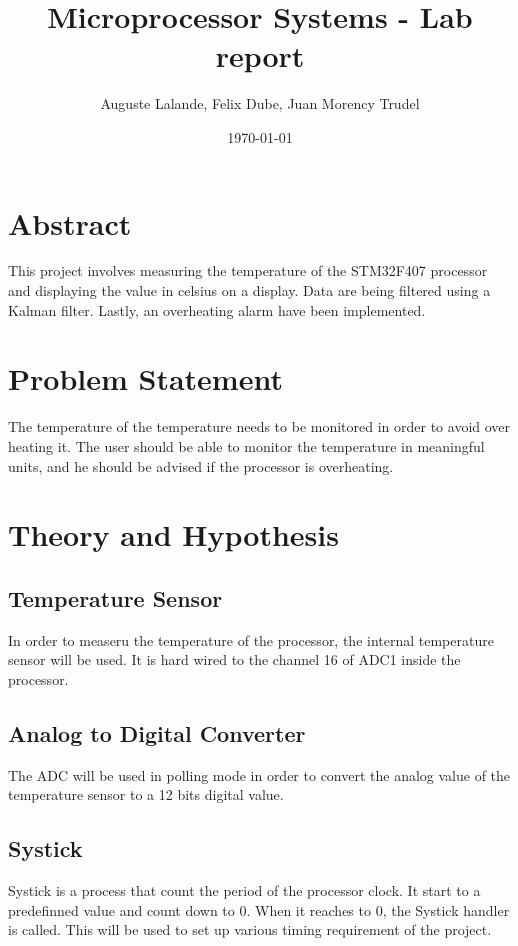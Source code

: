 \documentclass[12pt]{article}
\title{Microprocessor Systems - Lab report}
\author{Auguste Lalande, Felix Dube, Juan Morency Trudel}
\date{\today}
\begin{document}
\maketitle
\clearpage

\tableofcontents
\clearpage

\section{Abstract}
This project involves measuring the temperature of the STM32F407 processor and displaying the value in celsius on a display. Data are being filtered using a Kalman filter. Lastly, an overheating alarm have been implemented.

\section{Problem Statement}
The temperature of the temperature needs to be monitored in order to avoid over heating it. The user should be able to monitor the temperature in meaningful units, and he should be advised if the processor is overheating.

\section{Theory and Hypothesis}
\subsection{Temperature Sensor}
In order to measeru the temperature of the processor, the internal temperature sensor will be used. It is hard wired to the channel 16 of ADC1 inside the processor.

\subsection{Analog to Digital Converter}
The ADC will be used in polling mode in order to convert the analog value of the temperature sensor to a 12 bits digital value.

\subsection{Systick}
Systick is a process that count the period of the processor clock. It start to a predefinned value and count down to 0. When it reaches to 0, the Systick handler is called. This will be used to set up various timing requirement of the project.
\end{document}
